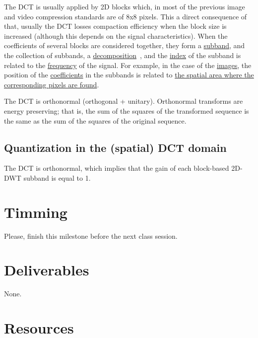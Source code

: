 The DCT is usually applied by 2D blocks which, in most of the previous
image and video compression standards are of 8x8 pixels. This a direct
consequence of that, usually the DCT losses compaction efficiency when
the block size is increased (although this depends on the signal
characteristics). When the coefficients of several blocks are
considered together, they form a
\href{https://en.wikipedia.org/wiki/Sub-band_coding}{subband}, and the
collection of subbands, a
\href{https://en.wikipedia.org/wiki/Discrete_wavelet_transform}{decomposition}~\cite{vetterli2014foundations},
and the
\href{https://en.wikipedia.org/wiki/Array_data_structure#Element_identifier_and_addressing_formulas}{index}
of the subband is related to the
\href{https://en.wikipedia.org/wiki/Frequency}{frequency} of the
signal. For example, in the case of the
\href{https://en.wikipedia.org/wiki/Digital_image}{images}, the
position of the
\href{https://en.wikipedia.org/wiki/Coefficient}{coefficients} in the
subbands is related to
\href{https://github.com/Sistemas-Multimedia/Sistemas-Multimedia.github.io/blob/master/milestones/07-DCT/block_DCT_compression.ipynb}{the
  spatial area where the corresponding pixels are found}.

The DCT is orthonormal (orthogonal + unitary). Orthonormal transforms
are energy preserving; that is, the sum of the squares of the
transformed sequence is the same as the sum of the squares of the
original sequence.

\subsection{Quantization in the (spatial) DCT domain}

The DCT is orthonormal, which implies that the gain of each block-based 2D-DWT subband is equal to 1.

\section{Timming}

Please, finish this milestone before the next class session.

\section{Deliverables}

None.

\section{Resources}

\renewcommand{\addcontentsline}[3]{}%


